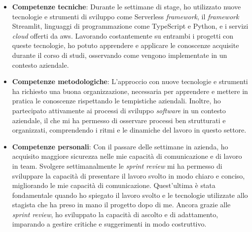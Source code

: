 \begin{itemize}
    \item \textbf{Competenze tecniche}: Durante le settimane di stage, ho utilizzato nuove tecnologie e strumenti di sviluppo come Serverless \textit{framework}, il \textit{framework} Streamlit, linguaggi di programmazione come TypeScript e Python, e i servizi \textit{cloud} offerti da \gls{aws}. Lavorando costantemente su entrambi i progetti con queste tecnologie, ho potuto apprendere e applicare le conoscenze acquisite durante il corso di studi, osservando come vengono implementate in un contesto aziendale.
    \item \textbf{Competenze metodologiche}: L'approccio con nuove tecnologie e strumenti ha richiesto una buona organizzazione, necessaria per apprendere e mettere in pratica le conoscenze rispettando le tempistiche aziendali. Inoltre, ho partecipato attivamente ai processi di sviluppo \textit{software} in un contesto aziendale, il che mi ha permesso di osservare processi ben strutturati e organizzati, comprendendo i ritmi e le dinamiche del lavoro in questo settore.
    \item \textbf{Competenze personali}: Con il passare delle settimane in azienda, ho acquisito maggiore sicurezza nelle mie capacità di comunicazione e di lavoro in team. Svolgere settimanalmente le \textit{sprint review} mi ha permesso di sviluppare la capacità di presentare il lavoro svolto in modo chiaro e conciso, migliorando le mie capacità di comunicazione. Quest'ultima è stata fondamentale quando ho spiegato il lavoro svolto e le tecnologie utilizzate allo stagista che ha preso in mano il progetto dopo di me. Ancora grazie alle \textit{sprint review}, ho sviluppato la capacità di ascolto e di adattamento, imparando a gestire critiche e suggerimenti in modo costruttivo.
\end{itemize}

